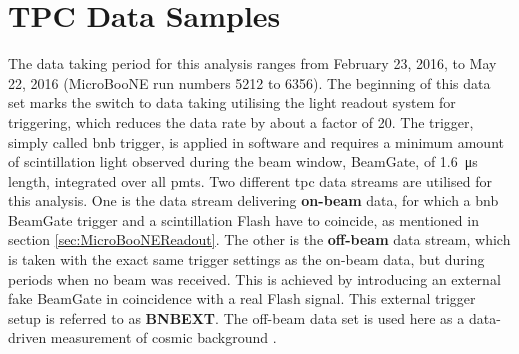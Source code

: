 \section{TPC Data Samples} \label{sec:DataSamples}
The data taking period for this analysis ranges from February 23, 2016, to May 22, 2016 (MicroBooNE run numbers \num{5212} to \num{6356}). The beginning of this data set marks the switch to data taking utilising the light readout system for triggering, which reduces the data rate by about a factor of \num{20}. The trigger, simply called \gls{bnb} trigger, is applied in software and requires a minimum amount of scintillation light observed during the beam window, \ie \gls{BeamGate}, of \SI{1.6}{\micro\second} length, integrated over all \glspl{pmt}. Two different \gls{tpc} data streams are utilised for this analysis. One is the data stream delivering \textbf{on-beam} data, for which a \gls{bnb} \gls{BeamGate} trigger and a scintillation \gls{Flash} have to coincide, as mentioned in section \ref{sec:MicroBooNEReadout}. The other is the \textbf{off-beam} data stream, which is taken with the exact same trigger settings as the on-beam data, but during periods when no beam was received. This is achieved by introducing an external fake \gls{BeamGate} in coincidence with a real \gls{Flash} signal. This external trigger setup is referred to as \textbf{BNBEXT}. The off-beam data set is used here as a data-driven measurement of cosmic background \cite{MicroBooNECCInclPN}.

